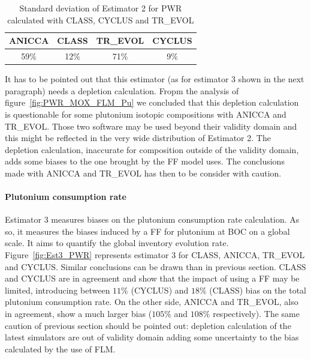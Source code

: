 \begin{table}[h]
	\begin{center}
		\begin{tabular}{|c||c||c||c|}
			\hline 
				ANICCA & CLASS & TR\_EVOL & CYCLUS \\
			\hline
				59\% & 12\% & 71\% & 9\% \\
			\hline
		\end{tabular}
	\end{center}
	\label{table:Est2_PWR}
	\caption{Standard deviation of Estimator 2 for \gls{PWR} calculated with CLASS, CYCLUS and TR\_EVOL}
\end{table}

It has to be pointed out that this estimator (as for estimator 3 shown in the next paragraph) needs a depletion calculation.
Fropm the analysis of figure~\ref{fig:PWR_MOX_FLM_Pu} we concluded that this depletion calculation is questionable for some plutonium isotopic compositions with ANICCA and TR\_EVOL.
Those two software may be used beyond their validity domain and this might be reflected in the very wide distribution of Estimator 2.
The depletion calculation, inaccurate for composition outside of the validity domain, adds some biases to the one brought by the \gls{FF} model uses.
The conclusions made with ANICCA and TR\_EVOL has then to be consider with caution.

\paragraph{Plutonium consumption rate}

Estimator 3 measures biases on the plutonium consumption rate calculation.
As so, it measures the biases induced by a \gls{FF} for plutonium at \gls{BOC} on a global scale.
It aims to quantify the global inventory evolution rate.
Figure~\ref{fig:Est3_PWR} represents estimator 3 for CLASS, ANICCA, TR\_EVOL and CYCLUS.
Similar conclusions can be drawn than in previous section.
CLASS and CYCLUS are in agreement and show that the impact of using a \gls{FF} may be limited, introducing between $11\%$ (CYCLUS) and $18\%$ (CLASS) bias on the total plutonium consumption rate.
On the other side, ANICCA and TR\_EVOL, also in agreement, show a much larger bias ($105\%$ and $108\%$ respectively).
The same caution of previous section should be pointed out: depletion calculation of the latest simulators are out of validity domain adding some uncertainty to the bias calculated by the use of \gls{FLM}.

